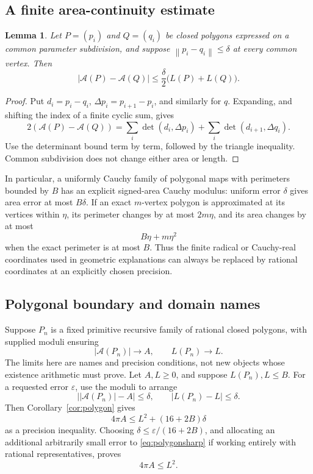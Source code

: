 \documentclass[11pt,a4paper]{article}
\newtheorem{lemma}[theorem]{Lemma}
\theoremstyle{definition}
\newcommand{\eps}{\varepsilon}
\newcommand{\norm}[1]{\left\|#1\right\|}
\newcommand{\Area}{\mathcal A}
\begin{document}
\subsection{A finite area-continuity estimate}
\begin{lemma}\label{lem:areacontinuity}
Let \(P=(p_i)\) and \(Q=(q_i)\) be closed polygons expressed on a
common parameter subdivision, and suppose
\(\norm{p_i-q_i}\le\delta\) at every common vertex. Then
\[
 |\Area(P)-\Area(Q)|
 \le\frac{\delta}{2}\bigl(L(P)+L(Q)\bigr).
 \tag{8.1}\label{eq:areacontinuity}
\]
\end{lemma}
\begin{proof}
Put \(d_i=p_i-q_i\), \(\Delta p_i=p_{i+1}-p_i\), and similarly
for \(q\). Expanding, and shifting the index of a finite cyclic sum,
gives
\[
 2(\Area(P)-\Area(Q))
 =\sum_i\det(d_i,\Delta p_i)
   +\sum_i\det(d_{i+1},\Delta q_i).
 \tag{8.2}\label{eq:areaidentity}
\]
Use the determinant bound term by term, followed by the triangle
inequality. Common subdivision does not change either area or length.
\end{proof}

In particular, a uniformly Cauchy family of polygonal maps with
perimeters bounded by \(B\) has an explicit signed-area Cauchy
modulus: uniform error \(\delta\) gives area error at most \(B\delta\).
If an exact \(m\)-vertex polygon is approximated at its vertices
within \(\eta\), its perimeter changes by at most \(2m\eta\), and
its area changes by at most
\[
 B\eta+m\eta^2
 \tag{8.3}\label{eq:vertexerror}
\]
when the exact perimeter is at most \(B\).
Thus the finite radical or Cauchy-real coordinates used in geometric
explanations can always be replaced by rational coordinates at an
explicitly chosen precision.

\subsection{Polygonal boundary and domain names}
Suppose \(P_n\) is a fixed primitive recursive family of rational
closed polygons, with supplied moduli ensuring
\[
 |\Area(P_n)|\longrightarrow A,\qquad L(P_n)\longrightarrow L.
 \tag{8.4}\label{eq:APnames}
\]
The limits here are names and precision conditions, not new objects
whose existence arithmetic must prove. Let
\(A,L\ge0\), and suppose \(L(P_n),L\le B\).
For a requested error \(\eps\), use the moduli to arrange
\[
 \bigl||\Area(P_n)|-A\bigr|\le\delta,\qquad
 |L(P_n)-L|\le\delta.
\]
Then Corollary~\ref{cor:polygon} gives
\[
 4\pi A\le L^2+(16+2B)\delta
 \tag{8.5}\label{eq:curvetransfer}
\]
as a precision inequality. Choosing
\(\delta\le\eps/(16+2B)\), and allocating an additional arbitrarily
small error to \eqref{eq:polygonsharp} if working entirely with
rational representatives, proves
\[
 \boxed{4\pi A\le L^2.}
 \tag{8.6}\label{eq:curveiso}
\]
\end{document}
